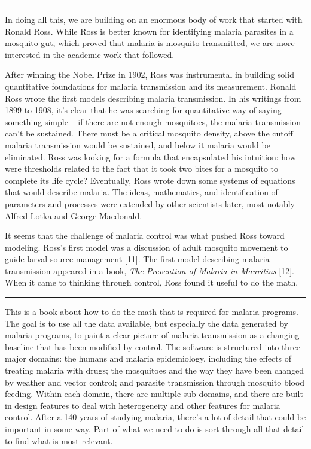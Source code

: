 \documentclass[
]{book}
\begin{document}
\begin{center}\rule{0.5\linewidth}{0.5pt}\end{center}

In doing all this, we are building on an enormous body of work that started with Ronald Ross. While Ross is better known for identifying malaria parasites in a mosquito gut, which proved that malaria is mosquito transmitted, we are more interested in the academic work that followed.

After winning the Nobel Prize in 1902, Ross was instrumental in building solid quantitative foundations for malaria transmission and its measurement. Ronald Ross wrote the first models describing malaria transmission. In his writings from 1899 to 1908, it's clear that he was searching for quantitative way of saying something simple -- if there are not enough mosquitoes, the malaria transmission can't be sustained. There must be a critical mosquito density, above the cutoff malaria transmission would be sustained, and below it malaria would be eliminated. Ross was looking for a formula that encapsulated his intuition: how were thresholds related to the fact that it took two bites for a mosquito to complete its life cycle? Eventually, Ross wrote down some systems of equations that would describe malaria. The ideas, mathematics, and identification of parameters and processes were extended by other scientists later, most notably Alfred Lotka and George Macdonald.

It seems that the challenge of malaria control was what pushed Ross toward modeling. Ross's first model was a discussion of adult mosquito movement to guide larval source management {[}\protect\hyperlink{ref-RossR1905LogicalBasis}{11}{]}. The first model describing malaria transmission appeared in a book, \emph{The Prevention of Malaria in Mauritius} {[}\protect\hyperlink{ref-RossR1908ReportPrevention}{12}{]}. When it came to thinking through control, Ross found it useful to do the math.

\begin{center}\rule{0.5\linewidth}{0.5pt}\end{center}

This is a book about how to do the math that is required for malaria programs. The goal is to use all the data available, but especially the data generated by malaria programs, to paint a clear picture of malaria transmission as a changing baseline that has been modified by control. The software is structured into three major domains: the humans and malaria epidemiology, including the effects of treating malaria with drugs; the mosquitoes and the way they have been changed by weather and vector control; and parasite transmission through mosquito blood feeding. Within each domain, there are multiple sub-domains, and there are built in design features to deal with heterogeneity and other features for malaria control. After a 140 years of studying malaria, there's a lot of detail that could be important in some way. Part of what we need to do is sort through all that detail to find what is most relevant.
\end{document}
